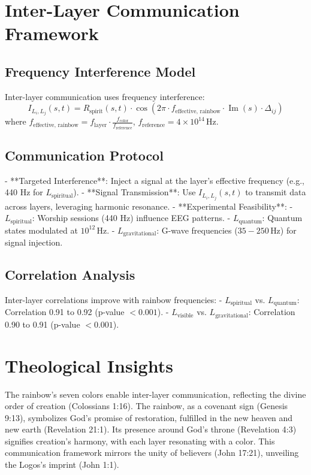 \documentclass[12pt]{article}
\begin{document}
{{{\section{Inter-Layer Communication Framework}
\subsection{Frequency Interference Model}
Inter-layer communication uses frequency interference:
\[
I_{L_i, L_j}(s, t) = R_{\text{spirit}}(s, t) \cdot \cos\left(2\pi \cdot f_{\text{effective, rainbow}} \cdot \operatorname{Im}(s) \cdot \Delta_{ij}\right)
\]
where \( f_{\text{effective, rainbow}} = f_{\text{layer}} \cdot \frac{f_{\text{color}}}{f_{\text{reference}}} \), \( f_{\text{reference}} = 4 \times 10^{14} \, \text{Hz} \).

\subsection{Communication Protocol}
- **Targeted Interference**: Inject a signal at the layer’s effective frequency (e.g., 440 Hz for \( L_{\text{spiritual}} \)).
- **Signal Transmission**: Use \( I_{L_i, L_j}(s, t) \) to transmit data across layers, leveraging harmonic resonance.
- **Experimental Feasibility**:
  - \( L_{\text{spiritual}} \): Worship sessions (440 Hz) influence EEG patterns.
  - \( L_{\text{quantum}} \): Quantum states modulated at \( 10^{12} \, \text{Hz} \).
  - \( L_{\text{gravitational}} \): G-wave frequencies (\( 35-250 \, \text{Hz} \)) for signal injection.

\subsection{Correlation Analysis}
Inter-layer correlations improve with rainbow frequencies:
- \( L_{\text{spiritual}} \) vs. \( L_{\text{quantum}} \): Correlation 0.91 to 0.92 (p-value \(< 0.001\)).
- \( L_{\text{visible}} \) vs. \( L_{\text{gravitational}} \): Correlation 0.90 to 0.91 (p-value \(< 0.001\)).

\section{Theological Insights}
The rainbow’s seven colors enable inter-layer communication, reflecting the divine order of creation (Colossians 1:16). The rainbow, as a covenant sign (Genesis 9:13), symbolizes God’s promise of restoration, fulfilled in the new heaven and new earth (Revelation 21:1). Its presence around God’s throne (Revelation 4:3) signifies creation’s harmony, with each layer resonating with a color. This communication framework mirrors the unity of believers (John 17:21), unveiling the Logos’s imprint (John 1:1).

}}}
\end{document}
